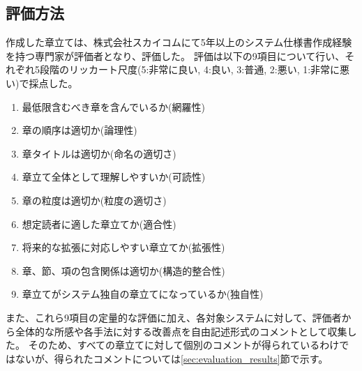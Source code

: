 \subsection{評価方法}
作成した章立ては、株式会社スカイコムにて5年以上のシステム仕様書作成経験を持つ専門家が評価者となり、評価した。
評価は以下の9項目について行い、それぞれ5段階のリッカート尺度\cite{likert}(5:非常に良い, 4:良い, 3:普通, 2:悪い, 1:非常に悪い)で採点した。

\begin{enumerate}
  \item 最低限含むべき章を含んでいるか(網羅性)
  \item 章の順序は適切か(論理性)
  \item 章タイトルは適切か(命名の適切さ)
  \item 章立て全体として理解しやすいか(可読性)
  \item 章の粒度は適切か(粒度の適切さ)
  \item 想定読者に適した章立てか(適合性)
  \item 将来的な拡張に対応しやすい章立てか(拡張性)
  \item 章、節、項の包含関係は適切か(構造的整合性)
  \item 章立てがシステム独自の章立てになっているか(独自性)
\end{enumerate}

また、これら9項目の定量的な評価に加え、各対象システムに対して、評価者から全体的な所感や各手法に対する改善点を自由記述形式のコメントとして収集した。
そのため、すべての章立てに対して個別のコメントが得られているわけではないが、得られたコメントについては\ref{sec:evaluation_results}節で示す。



